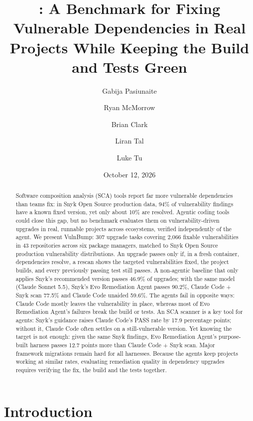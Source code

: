 \documentclass[11pt]{article}
\title{\bench{}: A Benchmark for Fixing Vulnerable Dependencies in Real Projects While Keeping the Build and Tests Green}
\author[1]{Gabija Pasiunaite}
\author[1]{Ryan McMorrow}
\author[1]{Brian Clark}
\author[1]{Liran Tal}
\author[2,1]{Luke Tu}
\affil[1]{Snyk}
\affil[2]{Brown University}
\date{October 12, 2026}
\theoremstyle{definition}
\newcommand{\bench}{VulnBump}
\newcommand{\evo}{Evo Remediation Agent}
\newcommand{\aided}{Claude Code + Snyk scan}
\newcommand{\unaided}{Claude Code unaided}
\begin{document}
\maketitle

\begin{abstract}
Software composition analysis (SCA) tools report far more vulnerable dependencies than teams fix: in Snyk Open Source production data, 94\% of vulnerability findings have a known fixed version, yet only about 10\% are resolved. Agentic coding tools could close this gap, but no benchmark evaluates them on vulnerability-driven upgrades in real, runnable projects across ecosystems, verified independently of the agent. We present \bench{}: 307 upgrade tasks covering 2{,}066 fixable vulnerabilities in 43 repositories across six package managers, matched to Snyk Open Source production vulnerability distributions. An upgrade passes only if, in a fresh container, dependencies resolve, a rescan shows the targeted vulnerabilities fixed, the project builds, and every previously passing test still passes. A non-agentic baseline that only applies Snyk's recommended version passes 46.9\% of upgrades; with the same model (Claude Sonnet 5.5), Snyk's \evo{} passes 90.2\%, \aided{} 77.5\% and \unaided{} 59.6\%. The agents fail in opposite ways: Claude Code mostly leaves the vulnerability in place, whereas most of \evo{}'s failures break the build or tests. An SCA scanner is a key tool for agents: Snyk's guidance raises Claude Code's PASS rate by 17.9 percentage points; without it, Claude Code often settles on a still-vulnerable version. Yet knowing the target is not enough: given the same Snyk findings, \evo{}'s purpose-built harness passes 12.7 points more than \aided{}. Major framework migrations remain hard for all harnesses. Because the agents keep projects working at similar rates, evaluating remediation quality in dependency upgrades requires verifying the fix, the build and the tests together.
\end{abstract}

\section{Introduction}
\label{sec:intro}
\end{document}
